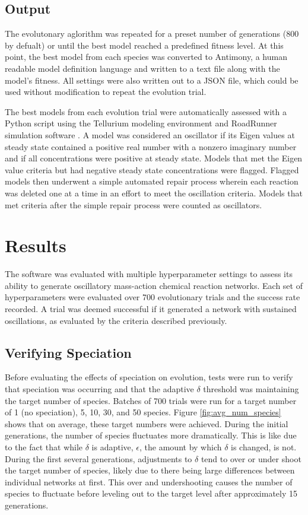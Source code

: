 \documentclass[12pt]{report}
\begin{document}
\subsection{Output}
The evolutonary aglorithm was repeated for a preset number of generations (800 by defualt) or until the best model reached a predefined fitness level. At this point, the best model from each species was converted to Antimony, a human readable model definition language \cite{Smith2009} and written to a text file along with the model's fitness. All settings were also written out to a JSON file, which could be used without modification to repeat the evolution trial.

The best models from each evolution trial were automatically assessed with a Python script using the Tellurium modeling environment \cite{Choi2018} and RoadRunner simulation software \cite{andy2020}. A model was considered an oscillator if its Eigen values at steady state contained a positive real number with a nonzero imaginary number and if all concentrations were positive at steady state. Models that met the Eigen value criteria but had negative steady state concentrations were flagged. Flagged models then underwent a simple automated repair process wherein each reaction was deleted one at a time in an effort to meet the oscillation criteria. Models that met criteria after the simple repair process were counted as oscillators.

\section{Results}
The software was evaluated with multiple hyperparameter settings to assess its ability to generate oscillatory mass-action chemical reaction networks. Each set of hyperparameters were evaluated over 700 evolutionary trials and the success rate recorded. A trial was deemed successful if it generated a network with sustained oscillations, as evaluated by the criteria described previously.


\subsection{Verifying Speciation}
Before evaluating the effects of speciation on evolution, tests were run to verify that speciation was occurring and that the adaptive $\delta$ threshold was maintaining the target number of species. Batches of 700 trials were run for a target number of 1 (no speciation), 5, 10, 30, and 50 species. Figure \ref{fig:avg_num_species} shows that on average, these target numbers were achieved. During the initial generations, the number of species fluctuates more dramatically. This is like due to the fact that while $\delta$ is adaptive, $\epsilon$, the amount by which $\delta$ is changed, is not. During the first several generations, adjustments to $\delta$ tend to over or under shoot the target number of species, likely due to there being large differences between individual networks at first. This over and undershooting causes the number of species to fluctuate before leveling out to the target level after approximately 15 generations.
\end{document}
